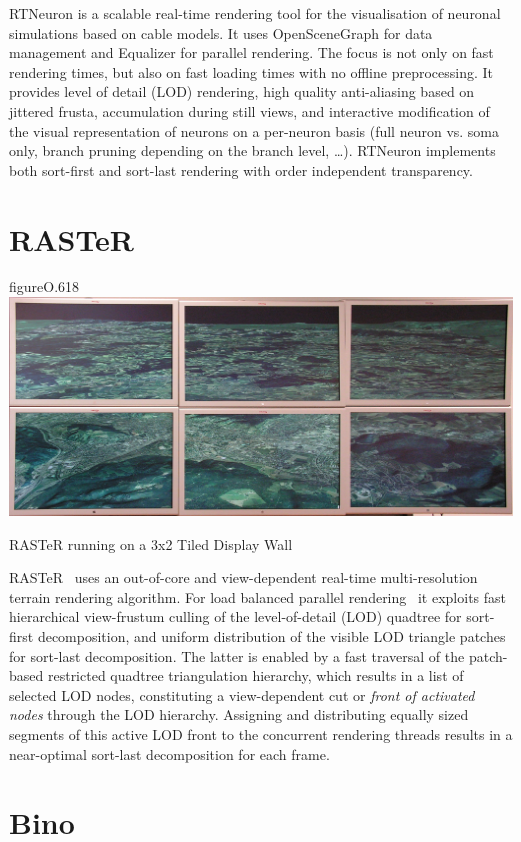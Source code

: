 RTNeuron \cite{HBBES:13} is a scalable real-time rendering tool for the
visualisation of neuronal simulations based on cable models. It uses
OpenSceneGraph for data management and Equalizer for parallel rendering.
The focus is not only on fast rendering times, but also on fast loading times with no
offline preprocessing. It provides level of detail (LOD) rendering, high quality
anti-aliasing based on jittered frusta, accumulation during still views, and
interactive modification of the visual representation of neurons on a per-neuron
basis (full neuron vs. soma only, branch pruning depending on the branch level,
\dots). RTNeuron implements both sort-first and sort-last rendering with order
independent transparency.

\section{RASTeR}

\begin{wrapfloat}{figure}{O}{.618\textwidth}
  \includegraphics[width=.618\textwidth]{images/raster}
  {\caption{\label{fRaster}RASTeR running on a 3x2 Tiled Display Wall}}
\end{wrapfloat}

RASTeR~\cite{BGP:09} uses an out-of-core and view-dependent real-time
multi-resolution terrain rendering algorithm. For load balanced parallel rendering~\cite{GMBP:10} it
exploits fast hierarchical view-frustum culling of the level-of-detail (LOD)
quadtree for sort-first decomposition, and uniform distribution of the visible
LOD triangle patches for sort-last decomposition. The latter is enabled by a
fast traversal of the patch-based restricted quadtree triangulation hierarchy,
which results in a list of selected LOD nodes, constituting a view-dependent cut
or \emph{front of activated nodes} through the LOD hierarchy. Assigning and
distributing equally sized segments of this active LOD front to the concurrent
rendering threads results in a near-optimal sort-last decomposition for each
frame.

\section{Bino}

